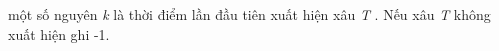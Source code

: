 một số nguyên \emph{ k } là thời điểm lần đầu tiên xuất hiện xâu \emph{ T } . Nếu xâu \emph{ T } không xuất hiện ghi -1.

\